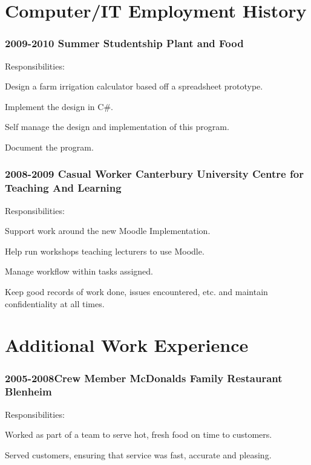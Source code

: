 \documentclass[10pt]{article}
\newenvironment{packed_items}{
    \begin{itemize}
    \setlength{\itemsep}{1pt}
    \setlength{\parskip}{0pt}
    \setlength{\parsep}{0pt}
}{\end{itemize}}
\begin{document}
    \section*{Computer/IT Employment History}
        \subsubsection*{2009-2010 \quad Summer Studentship \quad Plant and Food}\small
            Responsibilities:
            \begin{packed_items}
                \item{Design a farm irrigation calculator based off a spreadsheet prototype.}
                \item{Implement the design in C\#.}
                \item{Self manage the design and implementation of this program.}
                \item{Document the program.}
            \end{packed_items}
        \subsubsection*{2008-2009 \quad Casual Worker \quad Canterbury University Centre for Teaching And Learning}\small
            Responsibilities:
            \begin{packed_items}
                \item{Support work around the new Moodle Implementation.}
                \item{Help run workshops teaching lecturers to use Moodle.}
                \item{Manage workflow within tasks assigned.}
                \item{Keep good records of work done, issues encountered, etc. and maintain confidentiality at all times.}
            \end{packed_items}
    \section*{Additional Work Experience}
        \subsubsection*{2005-2008\quad Crew Member \quad McDonalds Family Restaurant Blenheim}\small
            Responsibilities:
            \begin{packed_items}
                \item{Worked as part of a team to serve hot, fresh food on time to customers.}
                \item{Served customers, ensuring that service was fast, accurate and pleasing.}
            \end{packed_items}
\end{document}
